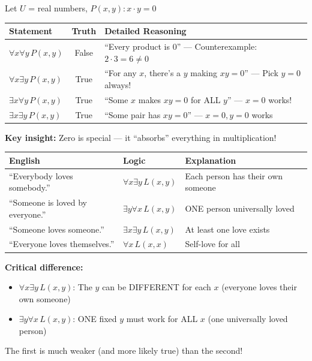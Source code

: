 \documentclass[11pt,a4paper]{article}
\begin{document}
\begin{examplebox}
Let $U$ = real numbers, $P(x,y) : x \cdot y = 0$

\begin{center}
\begin{tabular}{l|c|l}
\toprule
\textbf{Statement} & \textbf{Truth} & \textbf{Detailed Reasoning} \\
\midrule
$\forall x \forall y\, P(x,y)$ & False & ``Every product is 0'' --- Counterexample: $2 \cdot 3 = 6 \neq 0$ \\
$\forall x \exists y\, P(x,y)$ & True & ``For any $x$, there's a $y$ making $xy = 0$'' --- Pick $y = 0$ always! \\
$\exists x \forall y\, P(x,y)$ & True & ``Some $x$ makes $xy = 0$ for ALL $y$'' --- $x = 0$ works! \\
$\exists x \exists y\, P(x,y)$ & True & ``Some pair has $xy = 0$'' --- $x = 0, y = 0$ works \\
\bottomrule
\end{tabular}
\end{center}

\textbf{Key insight:} Zero is special --- it ``absorbs'' everything in multiplication!
\end{examplebox}

\begin{examplebox}
\begin{center}
\begin{tabular}{l|l|l}
\toprule
\textbf{English} & \textbf{Logic} & \textbf{Explanation} \\
\midrule
``Everybody loves somebody.'' & $\forall x \exists y\, L(x,y)$ & Each person has their own someone \\
``Someone is loved by everyone.'' & $\exists y \forall x\, L(x,y)$ & ONE person universally loved \\
``Someone loves someone.'' & $\exists x \exists y\, L(x,y)$ & At least one love exists \\
``Everyone loves themselves.'' & $\forall x\, L(x,x)$ & Self-love for all \\
\bottomrule
\end{tabular}
\end{center}

\textbf{Critical difference:}
\begin{itemize}[noitemsep]
    \item $\forall x \exists y\, L(x,y)$: The $y$ can be DIFFERENT for each $x$ (everyone loves their own someone)
    \item $\exists y \forall x\, L(x,y)$: ONE fixed $y$ must work for ALL $x$ (one universally loved person)
\end{itemize}

The first is much weaker (and more likely true) than the second!
\end{examplebox}
\end{document}
